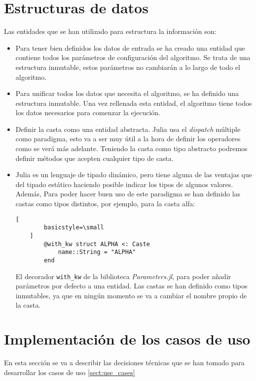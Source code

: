\section{Estructuras de datos}

Las entidades que se han utilizado para estructura la información son:
\begin{itemize}
    \item Para tener bien definidos los datos de entrada se ha creado una entidad que contiene todos los parámetros de
    configuración del algoritmo. Se trata de una estructura inmutable, estos parámetros no cambiarán a lo largo de todo el
    algoritmo.
    \item Para unificar todos los datos que necesita el algoritmo, se ha definido una estructura inmutable. Una vez
    rellenada esta entidad, el algoritmo tiene todos los datos necesarios para comenzar la ejecución.
    \item Definir la casta como una entidad abstracta. Julia usa el \emph{dispatch} múltiple como paradigma, 
    esto va a ser muy útil a la hora de definir los operadores como se verá más adelante. Teniendo la casta 
    como tipo abstracto podremos definir métodos que acepten cualquier tipo de casta.

    \item Julia es un lenguaje de tipado dinámico, pero tiene alguna de las ventajas que del tipado estático haciendo posible indicar
    los tipos de algunos valores. Además, Para poder hacer buen uso de este paradigma se han definido las castas como tipos distintos, por ejemplo, para
    la casta alfa:

    \begin{lstlisting}[
        basicstyle=\small
    ]
        @with_kw struct ALPHA <: Caste
            name::String = "ALPHA"
        end
    \end{lstlisting}

    El decorador \lstinline{with_kw} de la biblioteca \emph{Parameters.jl}, para poder añadir parámetros por defecto a una entidad. Las castas se han definido 
    como tipos inmutables, ya que en ningún momento se va a cambiar el nombre propio de la casta.
\end{itemize}

\section{Implementación de los casos de uso}

En esta sección se va a describir las decisiones técnicas que se han tomado para desarrollar los casos de uso \ref{sect:use_cases}

